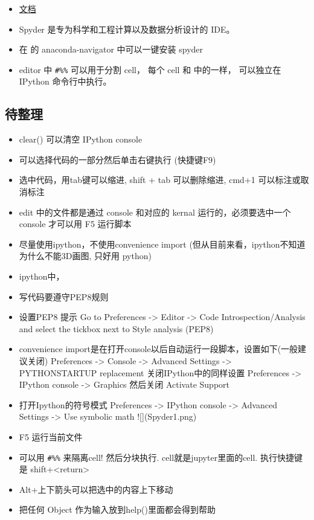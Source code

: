 
\begin{issues}
\issueDraft
\end{issues}

\begin{itemize}
\item \href{https://docs.spyder-ide.org/current/}{文档}
\item Spyder 是专为科学和工程计算以及数据分析设计的 IDE。
\item 在  的 anaconda-navigator 中可以一键安装 spyder
\item editor 中 \verb|#%%| 可以用于分割 cell， 每个 cell 和  中的一样， 可以独立在 IPython 命令行中执行。
\end{itemize}

\subsection{待整理}
\begin{itemize}
\item clear() 可以清空 IPython console
\item 可以选择代码的一部分然后单击右键执行 (快捷键F9)
\item 选中代码，用tab键可以缩进, shift + tab 可以删除缩进, cmd+1 可以标注或取消标注
\item edit 中的文件都是通过 console 和对应的 kernal 运行的，必须要选中一个 console 才可以用 F5 运行脚本
\item 尽量使用ipython，不使用convenience import (但从目前来看，ipython不知道为什么不能3D画图, 只好用 python)
\item ipython中，%
\item 写代码要遵守PEP8规则
\item 设置PEP8 提示
  Go to Preferences -> Editor -> Code Introspection/Analysis and select the tickbox next to Style analysis (PEP8)
\item convenience import是在打开console以后自动运行一段脚本，设置如下(一般建议关闭)
   Preferences -> Console -> Advanced Settings -> PYTHONSTARTUP replacement
   关闭IPython中的同样设置
   Preferences -> IPython console -> Graphics 然后关闭 Activate Support
\item 打开Ipython的符号模式
   Preferences -> IPython console -> Advanced Settings -> Use symbolic math
![](Spyder1.png)

\item F5 运行当前文件
\item 可以用 \verb|#%%| 来隔离cell! 然后分块执行. cell就是jupyter里面的cell. 执行快捷键是 shift+<return>
\item Alt+上下箭头可以把选中的内容上下移动
\item 把任何 Object 作为输入放到help()里面都会得到帮助
\end{itemize}
